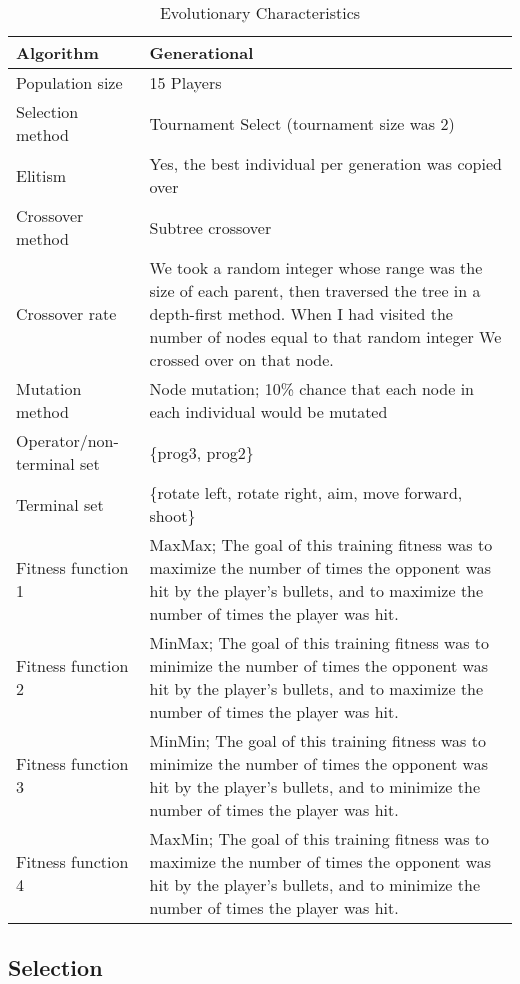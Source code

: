\documentclass{acm_proc_article-sp}
\begin{document}
\begin{table*}
\centering
\caption{Evolutionary Characteristics}
\label{evochar}
\begin{tabular}{|l|p{4in}|}
\hline
Algorithm & Generational\\
\hline
Population size & 15 Players\\
\hline
Selection method & Tournament Select (tournament size was 2)\\
\hline
Elitism & Yes, the best individual per generation was copied over\\
\hline
Crossover method & Subtree crossover\\
\hline
Crossover rate & We took a random integer whose range was the size of each parent, then traversed the tree in a depth-first method. When I had visited the number of nodes equal to that random integer We crossed over on that node.\\
\hline
Mutation method & Node mutation; 10\% chance that each node in each individual would be mutated\\
\hline
Operator/non-terminal set & \{prog3, prog2\}\\
\hline
Terminal set & \{rotate left, rotate right, aim, move forward, shoot\}\\
\hline
Fitness function 1 & MaxMax; The goal of this training fitness was to maximize the number of times the opponent was hit by the player's bullets, and to maximize the number of times the player was hit. \\
\hline
Fitness function 2 & MinMax; The goal of this training fitness was to minimize the number of times the opponent was hit by the player's bullets, and to maximize the number of times the player was hit. \\
\hline
Fitness function 3 & MinMin; The goal of this training fitness was to minimize the number of times the opponent was hit by the player's bullets, and to minimize the number of times the player was hit. \\
\hline
Fitness function 4 & MaxMin; The goal of this training fitness was to maximize the number of times the opponent was hit by the player's bullets, and to minimize the number of times the player was hit. \\
\hline
\end{tabular}
\end{table*}

\subsection{Selection}
\end{document}
